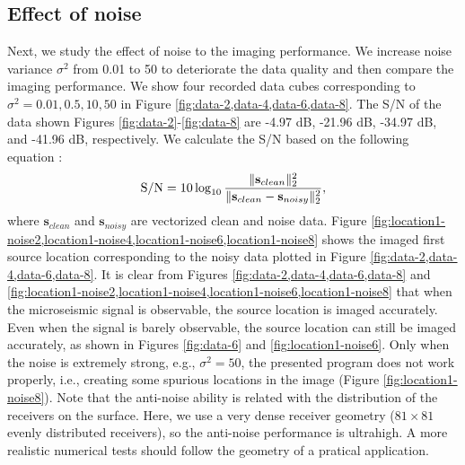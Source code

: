\subsection{Effect of noise}
Next, we study the effect of noise to the imaging performance. We increase noise variance $\sigma^2$ from 0.01 to 50 to deteriorate the data quality and then compare the imaging performance. We show four recorded data cubes corresponding to $\sigma^2=0.01,0.5,10,50$ in Figure \ref{fig:data-2,data-4,data-6,data-8}. The S/N of the data shown Figures \ref{fig:data-2}-\ref{fig:data-8} are -4.97 dB, -21.96 dB, -34.97 dB, and -41.96 dB, respectively. We calculate the S/N based on the following equation \cite[]{yangkang2015ortho}: 
\begin{equation}
\label{eq:diff}
\text{S/N}=10\log_{10}\frac{\Arrowvert \mathbf{s}_{clean} \Arrowvert_2^2}{\Arrowvert \mathbf{s}_{clean} -\mathbf{s}_{noisy}\Arrowvert_2^2},
\end{equation}
where $\mathbf{s}_{clean}$ and $\mathbf{s}_{noisy}$ are vectorized clean and noise data. Figure \ref{fig:location1-noise2,location1-noise4,location1-noise6,location1-noise8} shows the imaged first source location corresponding to the noisy data plotted in Figure \ref{fig:data-2,data-4,data-6,data-8}.  It is clear from Figures \ref{fig:data-2,data-4,data-6,data-8} and \ref{fig:location1-noise2,location1-noise4,location1-noise6,location1-noise8} that when the microseismic signal is observable, the source location is imaged accurately. Even when the signal is barely observable, the source location can still be imaged accurately, as shown in Figures \ref{fig:data-6} and \ref{fig:location1-noise6}. Only when the noise is extremely strong, e.g., $\sigma^2=50$, the presented program does not work properly, i.e., creating some spurious locations in the image (Figure \ref{fig:location1-noise8}). Note that the anti-noise ability is related with the distribution of the receivers on the surface. Here, we use a very dense receiver geometry ($81\times 81$ evenly distributed receivers), so the anti-noise performance is ultrahigh. A more realistic numerical tests should follow the geometry of a pratical application.


